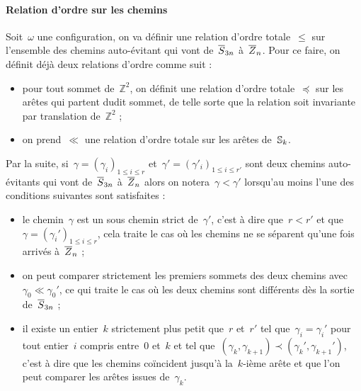 		\paragraph{Relation d'ordre sur les chemins}
			Soit~$\omega$ une configuration, on va définir une relation d'ordre totale~$\leq$ sur l'ensemble des chemins auto-évitant qui vont de~$\overline{S}_{3n}$ à~$\overline{Z}_{n}$. Pour ce faire, on définit déjà deux relations d'ordre comme suit :
			\begin{itemize}
				\item pour tout sommet de~$\mathbb{Z}^2$, on définit une relation d'ordre totale~$\preceq$ \marginnote{$\preceq$} sur les arêtes qui partent dudit sommet, de telle sorte que la relation soit invariante par translation de~$\mathbb{Z}^2$ ;
				\item on prend~$\ll$ \marginnote{$\ll$} une relation d'ordre totale sur les arêtes de~$\mathbb{S}_k$.
			\end{itemize}
			Par la suite, si~$\gamma = \left(\gamma_i\right)_{1\leq i\leq r}$ et~$\gamma'=\left(\gamma'_i\right)_{1\leq i\leq r'}$ sont deux chemins auto-évitants qui vont de~$\overline{S}_{3n}$ à~$\overline{Z}_{n}$ alors on notera~$\gamma <\gamma'$ \marginnote{$\leq$} lorsqu'au moins l'une des conditions suivantes sont satisfaites :
			\begin{itemize}
				\item le chemin~$\gamma$ est un sous chemin strict de~$\gamma'$, c'est à dire que~$r<r'$ et que~$\gamma = \left(\gamma_i'\right)_{1\leq i\leq r}$, cela traite le cas où les chemins ne se séparent qu'une fois arrivés à~$\overline{Z}_{n}$ ;
				\item on peut comparer strictement les premiers sommets des deux chemins avec~$\gamma_0 \ll \gamma_0'$, ce qui traite le cas où les deux chemins sont différents dès la sortie de~$\overline{S}_{3n}$ ;
				\item il existe un entier~$k$ strictement plus petit que~$r$ et~$r'$ tel que~$\gamma_i=\gamma_i'$ pour tout entier~$i$ compris entre~$0$ et~$k$ et tel que~$(\gamma_k,\gamma_{k+1}) \prec (\gamma_k',\gamma_{k+1}')$, c'est à dire que les chemins coïncident jusqu'à la~$k$-ième arête et que l'on peut comparer les arêtes issues de~$\gamma_k$.
		\end{itemize}
